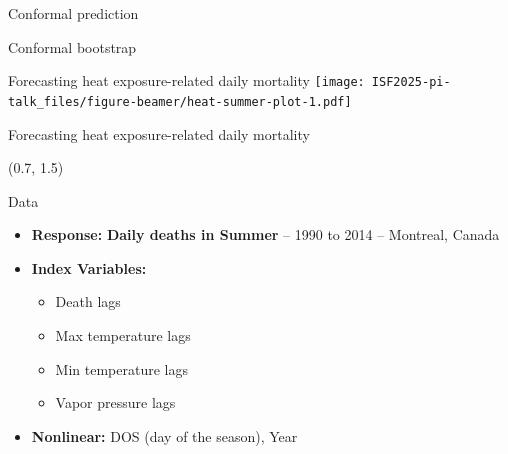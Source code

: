 \documentclass[
  12pt,
  ignorenonframetext,
  aspectratio=169,
]{beamer}
\begin{document}
\begin{frame}{Conformal prediction}
\label{conformal-prediction}
\end{frame}

\begin{frame}{Conformal bootstrap}
\label{conformal-bootstrap}
\end{frame}

\begin{frame}{Forecasting heat exposure-related daily mortality}
\label{forecasting-heat-exposure-related-daily-mortality}
\texttt{[image: ISF2025-pi-talk\_files/figure-beamer/heat-summer-plot-1.pdf]}
\end{frame}

\begin{frame}{Forecasting heat exposure-related daily mortality}
\label{forecasting-heat-exposure-related-daily-mortality-1}
\begin{textblock}{7}(0.7, 1.5)
\fontsize{11}{12}\sf
\begin{block}{Data}
  \begin{itemize}
    \item \color{violet} \textbf{Response:} \color{black} \textbf{Daily deaths in Summer} -- 1990 to 2014 -- Montreal, Canada
    \item \color{violet} \textbf{Index Variables:} 
      \begin{itemize}
        \item \color{black} Death lags
        \item \color{black} Max temperature lags
        \item \color{black} Min temperature lags
        \item \color{black} Vapor pressure lags
      \end{itemize}
    \item \color{violet}\textbf{Nonlinear:} \color{black} DOS (day of the season), Year \newline
  \end{itemize}
\end{block}
\end{textblock}
\end{frame}
\end{document}
